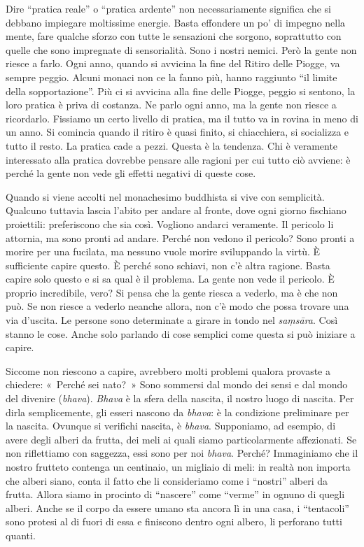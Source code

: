 Dire ``pratica reale'' o ``pratica ardente'' non necessariamente
significa che si debbano impiegare moltissime energie. Basta effondere
un po' di impegno nella mente, fare qualche sforzo con tutte le
sensazioni che sorgono, soprattutto con quelle che sono impregnate di
sensorialità. Sono i nostri nemici. Però la gente non riesce a farlo.
Ogni anno, quando si avvicina la fine del Ritiro delle Piogge, va sempre
peggio. Alcuni monaci non ce la fanno più, hanno raggiunto ``il limite
della sopportazione''. Più ci si avvicina alla fine delle Piogge, peggio
si sentono, la loro pratica è priva di costanza. Ne parlo ogni anno, ma
la gente non riesce a ricordarlo. Fissiamo un certo livello di pratica,
ma il tutto va in rovina in meno di un anno. Si comincia quando il
ritiro è quasi finito, si chiacchiera, si socializza e tutto il resto.
La pratica cade a pezzi. Questa è la tendenza. Chi è veramente
interessato alla pratica dovrebbe pensare alle ragioni per cui tutto ciò
avviene: è perché la gente non vede gli effetti negativi di queste cose.

Quando si viene accolti nel monachesimo buddhista si vive con
semplicità. Qualcuno tuttavia lascia l'abito per andare al fronte, dove
ogni giorno fischiano proiettili: preferiscono che sia così. Vogliono
andarci veramente. Il pericolo li attornia, ma sono pronti ad andare.
Perché non vedono il pericolo? Sono pronti a morire per una fucilata, ma
nessuno vuole morire sviluppando la virtù. È sufficiente capire questo.
È perché sono schiavi, non c'è altra ragione. Basta capire solo questo e
si sa qual è il problema. La gente non vede il pericolo. È proprio
incredibile, vero? Si pensa che la gente riesca a vederlo, ma è che non
può. Se non riesce a vederlo neanche allora, non c'è modo che possa
trovare una via d'uscita. Le persone sono determinate a girare in tondo
nel \emph{saṃsāra}. Così stanno le cose. Anche solo parlando di cose
semplici come questa si può iniziare a capire.

Siccome non riescono a capire, avrebbero molti problemi qualora provaste
a chiedere: «~Perché sei nato?~» Sono sommersi dal mondo dei sensi e dal
mondo del divenire (\emph{bhava}). \emph{Bhava} è la sfera della
nascita, il nostro luogo di nascita. Per dirla semplicemente, gli esseri
nascono da \emph{bhava}: è la condizione preliminare per la nascita.
Ovunque si verifichi nascita, è \emph{bhava}. Supponiamo, ad esempio, di
avere degli alberi da frutta, dei meli ai quali siamo particolarmente
affezionati. Se non riflettiamo con saggezza, essi sono per noi
\emph{bhava}. Perché? Immaginiamo che il nostro frutteto contenga un
centinaio, un migliaio di meli: in realtà non importa che alberi siano,
conta il fatto che li consideriamo come i ``nostri'' alberi da frutta.
Allora siamo in procinto di ``nascere'' come ``verme'' in ognuno di
quegli alberi. Anche se il corpo da essere umano sta ancora lì in una
casa, i ``tentacoli'' sono protesi al di fuori di essa e finiscono
dentro ogni albero, li perforano tutti quanti.

